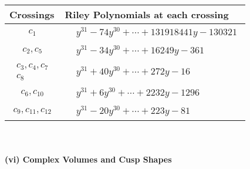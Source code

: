 \documentclass[1p]{elsarticle_modified}
\theoremstyle{definition}
\begin{document}
\begin{tabular}{m{50pt}|m{274pt}}
Crossings & \hspace{64pt}Riley Polynomials at each crossing \\
\hline $$\begin{aligned}c_{1}\end{aligned}$$&$\begin{aligned}
&y^{31}-74 y^{30}+\cdots+131918441 y-130321
\end{aligned}$\\
\hline $$\begin{aligned}c_{2},c_{5}\end{aligned}$$&$\begin{aligned}
&y^{31}-34 y^{30}+\cdots+16249 y-361
\end{aligned}$\\
\hline $$\begin{aligned}c_{3},c_{4},c_{7}\\c_{8}\end{aligned}$$&$\begin{aligned}
&y^{31}+40 y^{30}+\cdots+272 y-16
\end{aligned}$\\
\hline $$\begin{aligned}c_{6},c_{10}\end{aligned}$$&$\begin{aligned}
&y^{31}+6 y^{30}+\cdots+2232 y-1296
\end{aligned}$\\
\hline $$\begin{aligned}c_{9},c_{11},c_{12}\end{aligned}$$&$\begin{aligned}
&y^{31}-20 y^{30}+\cdots+223 y-81
\end{aligned}$\\
\hline
\end{tabular}\\~\\
\newpage\flushleft \textbf{(vi) Complex Volumes and Cusp Shapes}
\end{document}
